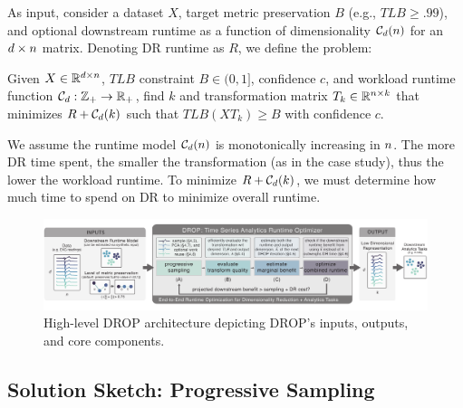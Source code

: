 As input, consider a dataset $X$, target metric preservation $B$ (e.g., $TLB \geq .99$), and optional downstream runtime as a function of dimensionality $\mathcal{C}_{\color{black}d}({\color{black}n})$ for an ${\color{black}d}\times {\color{black}n}$ matrix.  
Denoting DR runtime as $R$, we define the problem:
\begin{problem}
\label{def:opt}
  Given $X \in \mathbb{R}^{{\color{black}d} \times {\color{black}n}}$, $TLB$ constraint $B \in 
  (0, 1]$, confidence $c$, and workload runtime function $\mathcal{C}_{\color{black}d}:\mathbb{Z}_{+} \rightarrow \mathbb{R}_{+}$, find $k$ and transformation
  matrix $T_k \in \mathbb{R}^{{\color{black}n} \times k}$ that minimizes $R + \mathcal{C}_{\color{black}d}(k)$
  such that $TLB(XT_k) \geq B$ with confidence $c$.
\end{problem}

We assume the runtime model $\mathcal{C}_{\color{black}d}({\color{black}n})$ is monotonically increasing in ${\color{black}n}$.
The more DR time spent, the smaller the transformation (as in the case study), thus the lower the workload runtime.
To minimize $R + \mathcal{C}_{\color{black}d}(k)$, we must determine how much time to spend on DR to minimize overall runtime.

\begin{figure}
\label{fig:arch}
\begin{center}
\includegraphics[width=\textwidth]{figs/system_arch.pdf}\vspace{-1em}
\caption[]{High-level DROP architecture depicting DROP's inputs, outputs, and core components.}
\end{center}
\vspace{-1em}
\end{figure}


\subsection{Solution Sketch: Progressive Sampling}
\label{sec:sampling}


